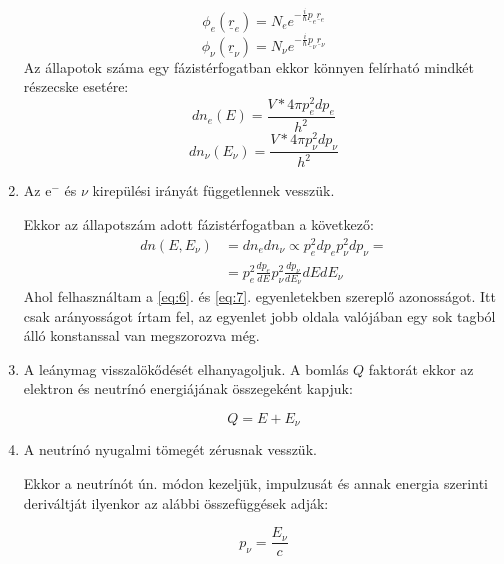 \begin{multicols}{2}
\begin{enumerate}
\begin{equation} \label{eq:4}
\phi_{e} \left( \underline{r}_{e} \right)
=
N_{e} e^{-\frac{i}{\hbar} \underline{p}_{e} \underline{r}_{e}}
\end{equation}
\begin{equation} \label{eq:5}
\phi_{\nu} \left( \underline{r}_{\nu} \right)
=
N_{\nu} e^{-\frac{i}{\hbar} \underline{p}_{\nu} \underline{r}_{\nu}}
\end{equation}
Az állapotok száma egy fázistérfogatban ekkor könnyen felírható mindkét részecske esetére:
\begin{equation} \label{eq:6}
dn_{e} \left( E \right)
=
\frac{V * 4 \pi p_{e}^{2} dp_{e}}{h^{2}}
\end{equation}
\begin{equation} \label{eq:7}
dn_{\nu} \left( E_{\nu} \right)
=
\frac{V * 4 \pi p_{\nu}^{2} dp_{\nu}}{h^{2}}
\end{equation}

\item Az e$^-$ és $\nu$ kirepülési irányát függetlennek vesszük. \par
Ekkor az állapotszám adott fázistérfogatban a következő:
\begin{align} \label{eq:8}
dn \left( E, E_{\nu} \right)
&=
dn_{e} dn_{\nu}
\propto
p_{e}^{2} dp_{e} p_{\nu}^{2} dp_{\nu}
= \nonumber \\
&=
p_{e}^{2} \frac{dp_{e}}{dE} p_{\nu}^{2} \frac{dp_{\nu}}{dE_{\nu}} dE dE_{\nu}
\end{align}
Ahol felhasználtam a \ref{eq:6}. és \ref{eq:7}. egyenletekben szereplő azonosságot. Itt csak arányosságot írtam fel, az egyenlet jobb oldala valójában egy sok tagból álló konstanssal van megszorozva még.

\item A leánymag visszalökődését elhanyagoljuk. A bomlás $Q$ faktorát ekkor az elektron és neutrínó energiájának összegeként kapjuk:

\begin{equation} \label{eq:9}
Q = E + E_{\nu}
\end{equation}

\item A neutrínó nyugalmi tömegét zérusnak vesszük. \par
Ekkor a neutrínót ún.  módon kezeljük, impulzusát és annak energia szerinti deriváltját ilyenkor az alábbi összefüggések adják:

\begin{equation} \label{eq:10}
p_{\nu}
=
\frac{E_{\nu}}{c}
\end{equation}


\end{enumerate}
\end{multicols}
